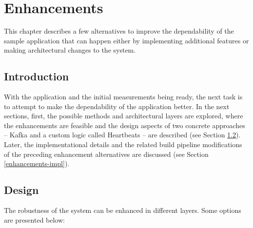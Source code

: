 \chapter{Enhancements} \label{enhancements}

This chapter describes a few alternatives to improve the dependability of the sample application that can happen either by implementing additional features or making architectural changes to the system.

\section{Introduction}

With the application and the initial measurements being ready, the next task is to attempt to make the dependability of the application better. In the next sections, first, the possible methods and architectural layers are explored, where the enhancements are feasible and the design aspects of two concrete approaches -- Kafka and a custom logic called Heartbeats -- are described (see Section \ref{enhancements-design}). Later, the implementational details and the related build pipeline modifications of the preceding enhancement alternatives are discussed (see Section \ref{enhancements-impl}).

\section{Design} \label{enhancements-design}


The robustness of the system can be enhanced in different layers. Some options are presented below:

